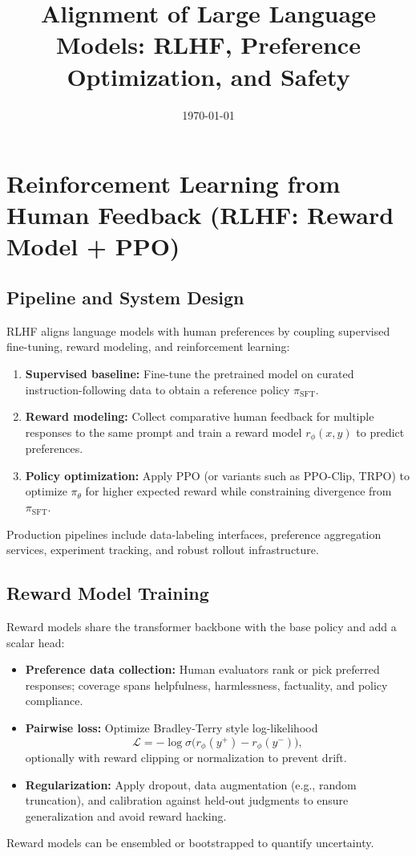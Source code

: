 \documentclass{article}
\title{Alignment of Large Language Models: RLHF, Preference Optimization, and Safety}
\author{}
\date{\today}
\begin{document}
\maketitle

\section{Reinforcement Learning from Human Feedback (RLHF: Reward Model + PPO)}
\subsection{Pipeline and System Design}
RLHF aligns language models with human preferences by coupling supervised fine-tuning, reward modeling, and reinforcement learning:
\begin{enumerate}
  \item \textbf{Supervised baseline:} Fine-tune the pretrained model on curated instruction-following data to obtain a reference policy $\pi_{\mathrm{SFT}}$.
  \item \textbf{Reward modeling:} Collect comparative human feedback for multiple responses to the same prompt and train a reward model $r_\phi(x, y)$ to predict preferences.
  \item \textbf{Policy optimization:} Apply PPO (or variants such as PPO-Clip, TRPO) to optimize $\pi_\theta$ for higher expected reward while constraining divergence from $\pi_{\mathrm{SFT}}$.
\end{enumerate}
Production pipelines include data-labeling interfaces, preference aggregation services, experiment tracking, and robust rollout infrastructure.

\subsection{Reward Model Training}
Reward models share the transformer backbone with the base policy and add a scalar head:
\begin{itemize}
  \item \textbf{Preference data collection:} Human evaluators rank or pick preferred responses; coverage spans helpfulness, harmlessness, factuality, and policy compliance.
  \item \textbf{Pairwise loss:} Optimize Bradley-Terry style log-likelihood
  \begin{equation}
    \mathcal{L} = -\log \sigma\big(r_\phi(y^+) - r_\phi(y^-)\big),
  \end{equation}
  optionally with reward clipping or normalization to prevent drift.
  \item \textbf{Regularization:} Apply dropout, data augmentation (e.g., random truncation), and calibration against held-out judgments to ensure generalization and avoid reward hacking.
\end{itemize}
Reward models can be ensembled or bootstrapped to quantify uncertainty.
\end{document}
